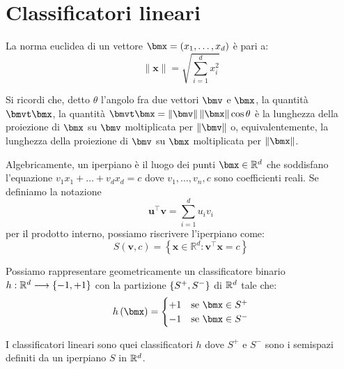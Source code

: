 \documentclass[\main/main.tex]{subfiles}
\begin{document}
\chapter{Classificatori lineari}
\begin{multicols}{2}
\begin{definition}
    La norma euclidea di un vettore \(\bmx = \rnd{x_1, \ldots, x_d}\) è pari a:
    \[
        \|\boldsymbol{x}\|=\sqrt{\sum_{i=1}^{d} x_{i}^{2}}
    \]
\end{definition}
\begin{definition}
    Si ricordi che, detto \(\theta\) l'angolo fra due vettori \(\bmv\) e \(\bmx\), la quantità \(\bmvt\bmx\), la quantità \(\bmvt\bmx = \norm{\bmv}\norm{\bmx}\cos\theta\) è la lunghezza della proiezione di \(\bmx\) su \(\bmv\) moltiplicata per \(\norm{\bmv}\) o, equivalentemente, la lunghezza della proiezione di \(\bmv\) su \(\bmx\) moltiplicata per \(\norm{\bmx}\).
\end{definition}
\begin{definition}[Iperpiano]
    Algebricamente, un iperpiano è il luogo dei punti \(\bmx \in \R^d\) che soddisfano l'equazione \(v_1x_1 + \ldots + v_dx_d = c\) dove \(v_1, \ldots, v_n, c\) sono coefficienti reali. Se definiamo la notazione
    \[
        \boldsymbol{u}^{\top} \boldsymbol{v}=\sum_{i=1}^{d} u_{i} v_{i}
    \]
    per il prodotto interno, possiamo riscrivere l'iperpiano come:
    \[
        S(\boldsymbol{v}, c)=\left\{\boldsymbol{x} \in \mathbb{R}^{d} : \boldsymbol{v}^{\top} \boldsymbol{x}=c\right\}
    \]
\end{definition}
\begin{observation}
    Possiamo rappresentare geometricamente un classificatore binario \(h:\mathbb{R}^d\longrightarrow \left\{-1, +1\right\}\) con la partizione \(\left\{S^+, S^-\right\}\) di \(\mathbb{R}^d\) tale che:
    \[
        h\rnd{\bmx} = \begin{cases}
            +1 & \text{se }\bmx \in S^+\\
            -1 & \text{se }\bmx \in S^-
        \end{cases}
    \]
\end{observation}
\begin{definition}
    I classificatori lineari sono quei classificatori \(h\) dove \(S^+\) e \(S^-\) sono i semispazi definiti da un iperpiano \(S\) in \(\mathbb{R}^d\).
\end{definition}
\begin{property}

\end{property}
\end{multicols}
\end{document}
